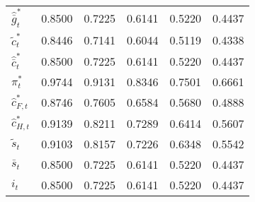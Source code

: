 \begin{center}
\begin{longtable}{lccccc}
${\hat {\bar g}_t^*}  $	 & 	    0.8500	 & 	    0.7225	 & 	    0.6141	 & 	    0.5220	 & 	    0.4437 \\ 
${\tilde c_t^*}       $	 & 	    0.8446	 & 	    0.7141	 & 	    0.6044	 & 	    0.5119	 & 	    0.4338 \\ 
${\hat {\bar c}_t^*}  $	 & 	    0.8500	 & 	    0.7225	 & 	    0.6141	 & 	    0.5220	 & 	    0.4437 \\ 
${\pi_t^*}            $	 & 	    0.9744	 & 	    0.9131	 & 	    0.8346	 & 	    0.7501	 & 	    0.6661 \\ 
${\hat c_{F,t}^*}     $	 & 	    0.8746	 & 	    0.7605	 & 	    0.6584	 & 	    0.5680	 & 	    0.4888 \\ 
${\hat c_{H,t}^*}     $	 & 	    0.9139	 & 	    0.8211	 & 	    0.7289	 & 	    0.6414	 & 	    0.5607 \\ 
${\tilde s_t}         $	 & 	    0.9103	 & 	    0.8157	 & 	    0.7226	 & 	    0.6348	 & 	    0.5542 \\ 
${\bar s_t}           $	 & 	    0.8500	 & 	    0.7225	 & 	    0.6141	 & 	    0.5220	 & 	    0.4437 \\ 
${i_t}                $	 & 	    0.8500	 & 	    0.7225	 & 	    0.6141	 & 	    0.5220	 & 	    0.4437 \\ 
\end{longtable}
 \end{center}
